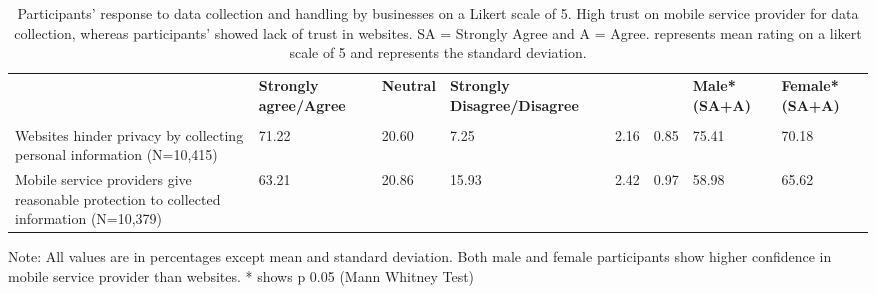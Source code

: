 \begin{table*}[!htbp]
 \centering
 \small
\caption{\small{Participants' response to data collection and handling by businesses on a Likert scale of 5. High trust on mobile service provider for data collection, whereas participants' showed lack of trust in websites. SA = Strongly Agree and A = Agree.  represents mean rating on a likert scale of 5 and  represents the standard deviation. }}
\setlength{\extrarowheight}{2pt}
\begin{tabular}{p{4.8cm} p{1.8cm} p{1.4cm} p{2cm} p{1.5cm} p{1.2cm} p{1cm} p{1cm}}
\midrule
\midrule
\centering
\raggedright & \bf{Strongly agree/Agree} & \bf{Neutral} & \bf{Strongly Disagree/Disagree} & \bf{ }&\bf{} & \bf{Male* (SA+A)} & \bf{Female* (SA+A)}\\
& &  & && & & \\
\midrule
\rowcolor {gray!15 } 
\raggedright Websites hinder privacy by collecting personal information (N=10,415) &71.22 &20.60 &7.25&2.16&0.85 &75.41&70.18\\
\raggedright Mobile service providers give reasonable protection to collected information (N=10,379) & 63.21 &20.86 &15.93 &2.42 & 0.97&58.98 & 65.62\\
\midrule
\midrule
\end{tabular}
\begin{tablenotes}
 \item{Note: All values are in percentages except mean and standard deviation. Both male and female participants show higher confidence in mobile service provider than websites. * shows p 0.05 (Mann Whitney Test)}
  \end{tablenotes}
  \vspace{-4mm}
\label{tab:pi2013:govcop}
\end{table*}


 


